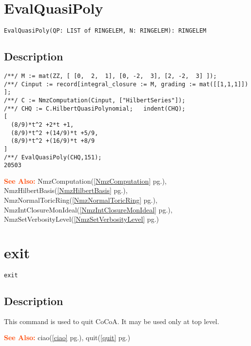 \documentclass[a4paper]{mybook}
\newenvironment{command}{}{} %
\newcommand\SeeAlso{\par\textcolor{OrangeRed}{\textbf{\large See Also: }}}
\begin{document}
\section{EvalQuasiPoly}
\label{EvalQuasiPoly}
\begin{command} %


\begin{Verbatim}[label=syntax, rulecolor=\color{MidnightBlue},
frame=single]
EvalQuasiPoly(QP: LIST of RINGELEM, N: RINGELEM): RINGELEM
\end{Verbatim}


\subsection*{Description}

\begin{Verbatim}[label=example, rulecolor=\color{PineGreen}, frame=single]
/**/ M := mat(ZZ, [ [0,  2,  1], [0, -2,  3], [2, -2,  3] ]);
/**/ Cinput := record[integral_closure := M, grading := mat([[1,1,1]]) ];
/**/ C := NmzComputation(Cinput, ["HilbertSeries"]);
/**/ CHQ := C.HilbertQuasiPolynomial;   indent(CHQ);
[
  (8/9)*t^2 +2*t +1,
  (8/9)*t^2 +(14/9)*t +5/9,
  (8/9)*t^2 +(16/9)*t +8/9
]
/**/ EvalQuasiPoly(CHQ,151);
20503
\end{Verbatim}


\SeeAlso %
  NmzComputation(\ref{NmzComputation} pg.\pageref{NmzComputation}), 
    NmzHilbertBasis(\ref{NmzHilbertBasis} pg.\pageref{NmzHilbertBasis}), 
    NmzNormalToricRing(\ref{NmzNormalToricRing} pg.\pageref{NmzNormalToricRing}), 
    NmzIntClosureMonIdeal(\ref{NmzIntClosureMonIdeal} pg.\pageref{NmzIntClosureMonIdeal}), 
    NmzSetVerbosityLevel(\ref{NmzSetVerbosityLevel} pg.\pageref{NmzSetVerbosityLevel})
\end{command} %

\section{exit}
\label{exit}
\begin{command} %


\begin{Verbatim}[label=syntax, rulecolor=\color{MidnightBlue},
frame=single]
exit
\end{Verbatim}


\subsection*{Description}

This command is used to quit CoCoA.  It may be used only at top level.

\SeeAlso %
  ciao(\ref{ciao} pg.\pageref{ciao}), 
    quit(\ref{quit} pg.\pageref{quit})
\end{command} %
\end{document}
